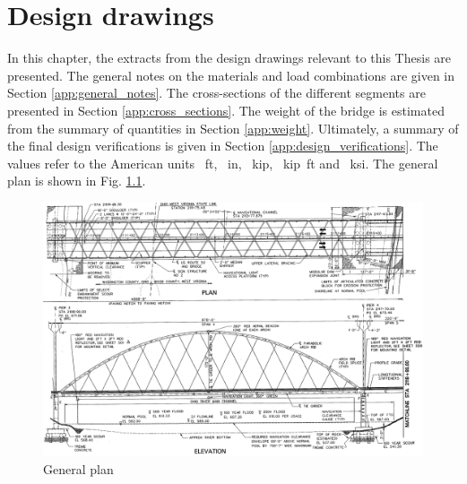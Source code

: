 \chapter{Design drawings}
In this chapter, the extracts from the design drawings relevant to this Thesis are presented. The general notes on the materials and load combinations are given in Section \ref{app:general_notes}. The cross-sections of the different segments are presented in Section \ref{app:cross_sections}. The weight of the bridge is estimated from the summary of quantities in Section \ref{app:weight}. Ultimately, a summary of the final design verifications is given in Section \ref{app:design_verifications}. The values refer to the American units \SI{}{ft}, \SI{}{in}, \SI{}{kip}, \SI{}{kip ft} and \SI{}{ksi}. The general plan is shown in Fig. \ref{fig:general_plan}.
\begin{figure}[H]
    \centering
    \includegraphics[width=\textwidth]{overleaf/Appendix/Design drawings/General Plan.png}
    \caption{General plan}
    \label{fig:general_plan}
\end{figure}

\newpage
